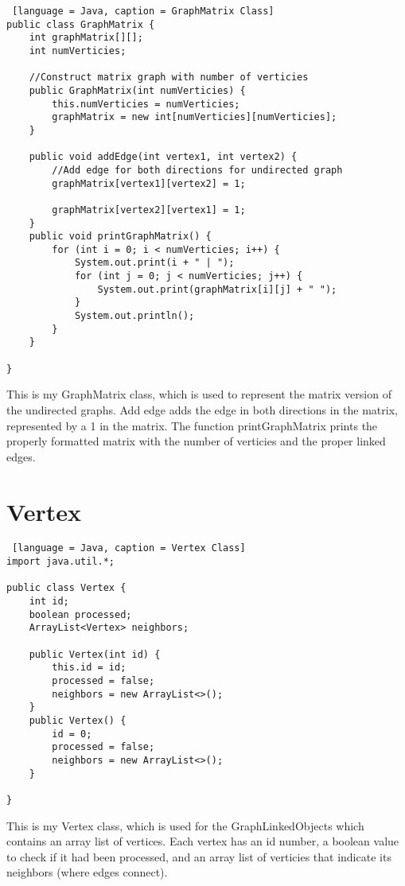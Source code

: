 \documentclass{article}
\begin{document}
\begin{lstlisting} [language = Java, caption = GraphMatrix Class]
public class GraphMatrix {
    int graphMatrix[][];
    int numVerticies;

    //Construct matrix graph with number of verticies
    public GraphMatrix(int numVerticies) {
        this.numVerticies = numVerticies;
        graphMatrix = new int[numVerticies][numVerticies];
    }

    public void addEdge(int vertex1, int vertex2) {
        //Add edge for both directions for undirected graph
        graphMatrix[vertex1][vertex2] = 1;

        graphMatrix[vertex2][vertex1] = 1;
    }
    public void printGraphMatrix() {
        for (int i = 0; i < numVerticies; i++) {
            System.out.print(i + " | ");
            for (int j = 0; j < numVerticies; j++) {
                System.out.print(graphMatrix[i][j] + " ");
            }
            System.out.println();
        }
    }
    
}
\end{lstlisting}

\noindent This is my GraphMatrix class, which is used to represent the matrix version of the undirected graphs. Add edge adds the edge in both directions in the matrix, represented by a 1 in the matrix. The function printGraphMatrix prints the properly formatted matrix with the number of verticies and the proper linked edges. 

\section{Vertex}
\begin{lstlisting} [language = Java, caption = Vertex Class]
import java.util.*;

public class Vertex {
    int id;
    boolean processed;
    ArrayList<Vertex> neighbors;

    public Vertex(int id) {
        this.id = id;
        processed = false;
        neighbors = new ArrayList<>();
    }
    public Vertex() {
        id = 0;
        processed = false;
        neighbors = new ArrayList<>();
    }
    
}
\end{lstlisting}
\noindent This is my Vertex class, which is used for the GraphLinkedObjects which contains an array list of vertices. Each vertex has an id number, a boolean value to check if it had been processed, and an array list of verticies that indicate its neighbors (where edges connect). 
\end{document}
